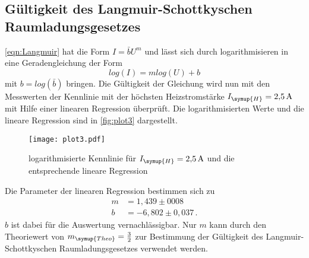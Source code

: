 \subsection{Gültigkeit des Langmuir-Schottkyschen Raumladungsgesetzes}
\label{sec:Langmuir}
\autoref{eqn:Langmuir} hat die Form $I=\bar{b}U^{m}$ und lässt sich durch logarithmisieren in eine
Geradengleichung der Form
\begin{equation*}
  log(I) = mlog(U)+b
\end{equation*}
mit $b = log(\bar{b})$ bringen. Die Gültigkeit der Gleichung wird nun mit den Messwerten der Kennlinie mit der
höchsten Heizstromstärke $I_{\symup{H}}=\SI{2,5}{\ampere}$ mit Hilfe einer linearen Regression überprüft.
Die logarithmisierten Werte und die lineare Regression sind in \autoref{fig:plot3} dargestellt.
\begin{figure}
  \centering
  \texttt{[image: plot3.pdf]}
  \caption{logarithmisierte Kennlinie für $I_{\symup{H}}=\SI{2,5}{\ampere}$ und die entsprechende lineare
  Regression}
  \label{fig:plot3}
\end{figure}
Die Parameter der linearen Regression bestimmen sich zu
\begin{align*}
  m &= 1,439 \pm 0008 \\
  b &= -6,802 \pm 0,037\,.
\end{align*}
$b$ ist dabei für die Auswertung vernachlässigbar. Nur $m$ kann durch den Theoriewert von $m_{\symup{Theo}}=
\frac{3}{2}$ zur Bestimmung der Gültigkeit des Langmuir-Schottkyschen Raumladungsgesetzes verwendet werden.

